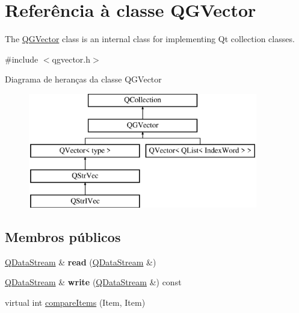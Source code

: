 \hypertarget{class_q_g_vector}{\section{Referência à classe Q\-G\-Vector}
\label{class_q_g_vector}
}


The \hyperlink{class_q_g_vector}{Q\-G\-Vector} class is an internal class for implementing Qt collection classes.  




{\ttfamily \#include $<$qgvector.\-h$>$}

Diagrama de heranças da classe Q\-G\-Vector\begin{figure}[H]
\begin{center}
\leavevmode
\includegraphics[height=5.000000cm]{class_q_g_vector}
\end{center}
\end{figure}
\subsection*{Membros públicos}
\begin{DoxyCompactItemize}
\item 
\hypertarget{class_q_g_vector_ab142b2e34eff3c5158dc9e9b629ac619}{\hyperlink{class_q_data_stream}{Q\-Data\-Stream} \& {\bfseries read} (\hyperlink{class_q_data_stream}{Q\-Data\-Stream} \&)}\label{class_q_g_vector_ab142b2e34eff3c5158dc9e9b629ac619}

\item 
\hypertarget{class_q_g_vector_a25d3618c02fcc4a8e4fde96b131d5348}{\hyperlink{class_q_data_stream}{Q\-Data\-Stream} \& {\bfseries write} (\hyperlink{class_q_data_stream}{Q\-Data\-Stream} \&) const }\label{class_q_g_vector_a25d3618c02fcc4a8e4fde96b131d5348}

\item 
virtual int \hyperlink{class_q_g_vector_ad0ea8a3a57df730076ce9f6d3de7775a}{compare\-Items} (Item, Item)
\end{DoxyCompactItemize}
